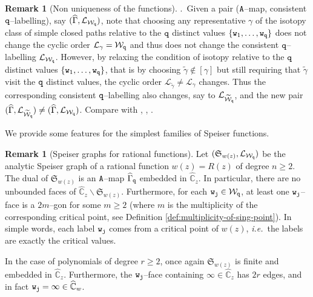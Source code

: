 \documentclass[final,3p,times]{elsarticle}
\newcommand{\CW}{\ensuremath{{\widehat{\mathbb C}}}}
\theoremstyle{definition}
\newtheorem{remark}[theorem]{Remark}
\begin{document}
\begin{remark}[Non uniqueness of the functions]
.\ Given a pair ($\tt A$--map, consistent $\tt q$--labelling), say 
$(\widehat{\Gamma}, \mathcal{L}_{\mathcal{W}_{\tt q}})$, 
note that choosing any representative $\gamma$ of the isotopy class of simple closed paths
relative to the $\tt q$ distinct values $\{ {\tt w}_{1},\ldots,{\tt w}_{\tt q} \}$ does not change
the cyclic order $\mathcal{L}_\gamma = \mathcal{W}_{\tt q}$ and thus does not change the 
consistent $\tt q$--labelling $\mathcal{L}_{\mathcal{W}_{\tt q}}$. 
However, by relaxing the condition of isotopy relative to the $\tt q$ distinct values 
$\{ {\tt w}_{1},\ldots,{\tt w}_{\tt q} \}$, that is by choosing $\widetilde{\gamma}\notin [\gamma]$
but still requiring that $\widetilde{\gamma}$ visit the $\tt q$ distinct values, 
the cyclic order $\mathcal{L}_{\widetilde{\gamma}} \neq \mathcal{L}_\gamma$ changes. Thus
the corresponding consistent $\tt q$--labelling also changes, say to 
$\mathcal{L}_{ \widetilde{\mathcal{W}}_{\tt q} }$, 
and the new pair 
$(\widehat{\Gamma}, \mathcal{L}_{ \widetilde{\mathcal{W}}_{\tt q} } ) \neq 
(\widehat{\Gamma}, \mathcal{L}_{\mathcal{W}_{\tt q}} )$. 
Compare with \cite{Habsch}, \cite{Tairova1}, \cite{Tairova2}.

\end{remark}

We provide some features for the simplest 
families of Speiser functions.

\begin{remark}[Speiser graphs for rational functions]
Let $(\mathfrak{S}_{w(z)}, \mathcal{L}_{\mathcal{W}_{\tt q}} )$
be the analytic Speiser graph of a rational function $w(z)=R(z)$ 
of degree $n \geq 2$.
The dual of $\mathfrak{S}_{w(z)}$ is an 
$\tt A$--map
$\widehat{\Gamma}_{\tt q}$ embedded in $\CW_z$. 
In particular, there are no unbounded faces of $\CW_z \backslash \mathfrak{S}_{w(z)}$.
Furthermore, 
for each ${\tt w}_{\tt j}\in\mathcal{W}_{\tt q}$, 
at least one ${\tt w}_{\tt j}$--face is a 
$2m$--gon for some $m \geq 2$ 
(where $m$ is the multiplicity of the corresponding critical point, 
see Definition \ref{def:multiplicity-of-sing-point}).
In simple words, each label 
${\tt w}_{\tt j}$ comes from a critical point of $w(z)$,
\emph{i.e.}\ the labels are exactly the critical values.


\noindent 
In the case of polynomials of degree $r \geq 2$, once again 
$\mathfrak{S}_{w(z)}$ is finite and embedded in $\CW_z$.
Furthermore, the ${\tt w}_{\tt j}$--face containing $\infty \in \CW_z$ 
has $2r$ edges, 
and in fact ${\tt w}_{\tt j}=\infty\in\CW_w$.
\end{remark}
\end{document}
